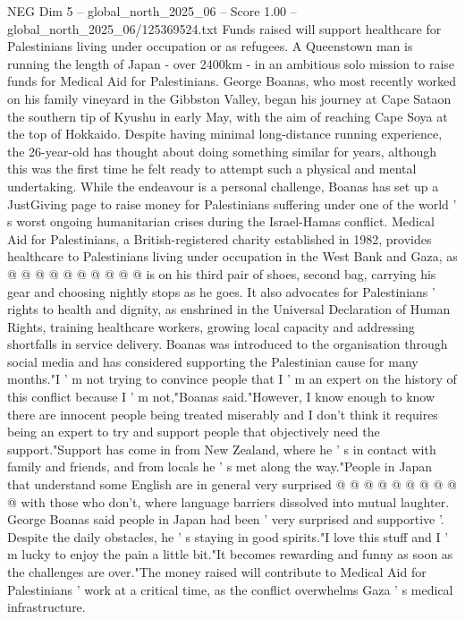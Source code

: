 \begin{textsample}{NEG Dim 5 – global\_north\_2025\_06 – Score 1.00 – global\_north\_2025\_06/125369524.txt}  \label{ex:f5_neg_375}
Funds raised will support healthcare for Palestinians living under occupation or as refugees.
A Queenstown man is running the length of Japan - over 2400km - in an ambitious solo mission to raise funds for Medical Aid for Palestinians.
George Boanas, who most recently worked on his family vineyard in the Gibbston Valley, began his journey at Cape Sataon the southern tip of Kyushu in early May, with the aim of reaching Cape Soya at the top of Hokkaido.
Despite having minimal long-distance running experience, the 26-year-old has thought about doing something similar for years, although this was the first time he felt ready to attempt such a physical and mental undertaking.
While the endeavour is a personal challenge, Boanas has set up a JustGiving page to raise money for Palestinians suffering under one of the world ' s worst ongoing humanitarian crises during the Israel-Hamas conflict.
Medical Aid for Palestinians, a British-registered charity established in 1982, provides healthcare to Palestinians living under occupation in the West Bank and Gaza, as @ @ @ @ @ @ @ @ @ @ is on his third pair of shoes, second bag, carrying his gear and choosing nightly stops as he goes.
It also advocates for Palestinians ' rights to health and dignity, as enshrined in the Universal Declaration of Human Rights, training healthcare workers, growing local capacity and addressing shortfalls in service delivery.
Boanas was introduced to the organisation through social media and has considered supporting the Palestinian cause for many months."I ' m not trying to convince people that I ' m an expert on the history of this conflict because I ' m not,"Boanas said."However, I know enough to know there are innocent people being treated miserably and I don't think it requires being an expert to try and support people that objectively need the support."Support has come in from New Zealand, where he ' s in contact with family and friends, and from locals he ' s met along the way."People in Japan that understand some English are in general very surprised @ @ @ @ @ @ @ @ @ @ with those who don't, where language barriers dissolved into mutual laughter.
George Boanas said people in Japan had been ' very surprised and supportive '.
Despite the daily obstacles, he ' s staying in good spirits."I love this stuff and I ' m lucky to enjoy the pain a little bit."It becomes rewarding and funny as soon as the challenges are over."The money raised will contribute to Medical Aid for Palestinians ' work at a critical time, as the conflict overwhelms Gaza ' s medical infrastructure.

\end{textsample}
